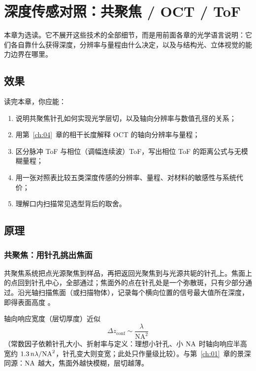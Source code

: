 \chapter{深度传感对照：共聚焦 / OCT / ToF}
\label{ch:10}

本章为选读。它不展开这些技术的全部细节，而是用前面各章的光学语言说明：它们各自靠什么获得深度，分辨率与量程由什么决定，以及与结构光、立体视觉的能力边界在哪里。

\section{效果}
\label{sec:ch09-effect}

读完本章，你应能：
\begin{enumerate}
  \item 说明共聚焦针孔如何实现光学层切，以及轴向分辨率与数值孔径的关系；
  \item 用第~\ref{ch:04}~章的相干长度解释 OCT 的轴向分辨率与量程；
  \item 区分脉冲 ToF 与相位（调幅连续波）ToF，写出相位 ToF 的距离公式与无模糊量程；
  \item 用一张对照表比较五类深度传感的分辨率、量程、对材料的敏感性与系统代价；
  \item 理解口内扫描常见选型背后的取舍。
\end{enumerate}

\section{原理}
\label{sec:ch09-principle}

\subsection{共聚焦：用针孔挑出焦面}

共聚焦系统把点光源聚焦到样品，再把返回光聚焦到与光源共轭的针孔上。焦面上的点回到针孔中心，全部通过；焦面外的点在针孔处是一个弥散斑，只有少部分通过。沿光轴扫描焦面（或扫描物体），记录每个横向位置的信号最大值所在深度，即得表面高度 \citep{WilsonSheppard1984}。

轴向响应宽度（层切厚度）近似
\begin{equation}
  \Delta z_{\mathrm{conf}}\sim\frac{\lambda}{\mathrm{NA}^2}
  \label{eq:ch10-conf}
\end{equation}
（常数因子依赖针孔大小、折射率与定义：理想小针孔、小 $\mathrm{NA}$ 时轴向响应半高宽约 $1.3\,n\lambda/\mathrm{NA}^2$，针孔变大则变宽；此处只作量级比较）。与第~\ref{ch:01}~章的景深同源：$\mathrm{NA}$ 越大，焦面外越快模糊，层切越薄。

